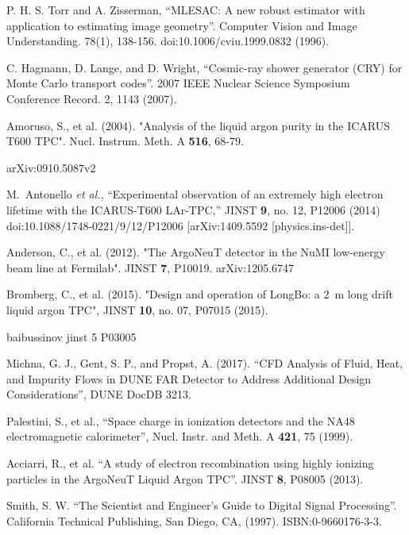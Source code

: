 \documentclass[10pt,a4paper]{article}
\begin{document}
\begin{thebibliography}{99}

 P. H. S. Torr and A. Zisserman, ``MLESAC: A new robust estimator with application to estimating image geometry''. Computer Vision and Image Understanding. 78(1), 138-156. doi:10.1006/cviu.1999.0832 (1996).

 C. Hagmann, D. Lange, and D. Wright, ``Cosmic-ray shower generator (CRY) for Monte Carlo transport codes''. 2007 IEEE Nuclear Science Symposium Conference Record. 2, 1143 (2007).

 Amoruso, S., et al. (2004). "Analysis of the liquid argon purity in the ICARUS T600 TPC". Nucl. Instrum. Meth. A {\bf 516}, 68-79.

 arXiv:0910.5087v2

 M.~Antonello {\it et al.},
  ``Experimental observation of an extremely high electron lifetime with the ICARUS-T600 LAr-TPC,''
  JINST {\bf 9}, no. 12, P12006 (2014)
  doi:10.1088/1748-0221/9/12/P12006
  [arXiv:1409.5592 [physics.ins-det]].
  
 Anderson, C., et al. (2012). "The ArgoNeuT detector in the NuMI low-energy beam line at Fermilab". JINST {\bf 7}, P10019. arXiv:1205.6747

 Bromberg, C., et al. (2015). "Design and operation of LongBo: a 2~m long drift liquid argon TPC", JINST {\bf 10}, no. 07, P07015 (2015).

 baibussinov jinst 5 P03005

 Michna, G. J., Gent, S. P., and Propst, A. (2017). ``CFD Analysis of Fluid, Heat, and Impurity Flows in DUNE FAR Detector to Address Additional Design Considerations'', DUNE DocDB 3213.

 Palestini, S., et al., ``Space charge in ionization detectors and the NA48 electromagnetic calorimeter'', Nucl. Instr. and Meth. A \textbf{421}, 75 (1999).

 Acciarri, R., et al. ``A study of electron recombination using highly ionizing particles in the ArgoNeuT Liquid Argon TPC''. JINST {\bf 8}, P08005 (2013).

 Smith, S. W. ``The Scientist and Engineer's Guide to Digital Signal Processing''. California Technical Publishing, San Diego, CA, (1997). ISBN:0-9660176-3-3.

\end{thebibliography}
\end{document}
